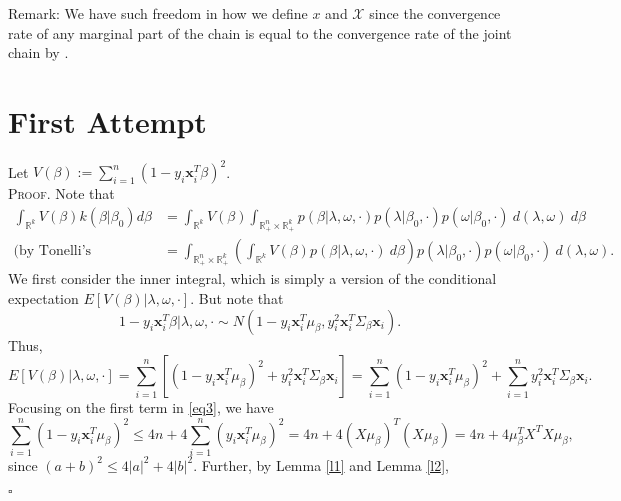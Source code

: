 \documentclass[12pt]{article}
\newcounter{ProofCounter}
\newenvironment{Proof}{\stepcounter{ProofCounter}\textsc{Proof.}}{\hfill$\square$}
\begin{document}
Remark: We have such freedom in how we define $x$ and $\mathcal{X}$ since the convergence rate of any marginal part of the chain is equal to the convergence rate
of the joint chain by \cite{jointvmarg}.

\section{First Attempt}

Let $V(\beta) := \sum_{i=1}^{n}(1 - y_i\bm{x}_i^T\beta)^2$. \\


\begin{Proof}
  Note that 
  \begin{align}
    \int_{\mathbb{R}^{k}} V(\beta) k(\beta|\beta_0)d\beta & = \int_{\mathbb{R}^{k}}V(\beta) \int_{\mathbb{R}^{n}_+\times \mathbb{R}^{k}_+}
    p(\beta|\lambda,\omega, \cdot)p(\lambda|\beta_0, \cdot)p(\omega|\beta_0, \cdot)\ d(\lambda, \omega)\ d\beta \nonumber \\
    \text{(by Tonelli's Theorem)} \ & = \int_{\mathbb{R}^{n}_+\times\mathbb{R}^{k}_+} \left( \int_{\mathbb{R}^{k}} V(\beta)p(\beta|\lambda, \omega,
    \cdot)\ d\beta \right) p(\lambda|\beta_0,\cdot)p(\omega|\beta_0, \cdot)\ d(\lambda, \omega).
    \label{eq0}
  \end{align}
  We first consider the inner integral, which is simply a version of the conditional expectation $E[V(\beta)|\lambda,\omega,\cdot]$.
  But note that 
  \begin{equation*}
    1 - y_i\bm{x}_i^T\beta | \lambda, \omega, \cdot \sim N\left( 1 - y_i\bm{x}_i^T\mu_{\beta}, y_i^2 \bm{x}_i^T \Sigma_{\beta}\bm{x}_i\right).
    \label{eq2}
  \end{equation*}
  Thus,
  \begin{equation}
    E[V(\beta)|\lambda,\omega,\cdot] = \sum_{i=1}^{n}\left[(1 - y_i\bm{x}_i^T\mu_{\beta})^2 + y_i^2 \bm{x}_i^T \Sigma_{\beta} \bm{x}_i\right] = \sum_{i=1}^{n}
    (1 - y_i\bm{x}_i^T\mu_{\beta})^2 + \sum_{i=1}^{n}y_i^2\bm{x}_i^T\Sigma_{\beta}\bm{x}_i.
    \label{eq3}
  \end{equation}
  Focusing on the first term in \eqref{eq3}, we have 
  \begin{equation}
    \sum_{i=1}^{n}(1 - y_i \bm{x}_i^T \mu_{\beta})^2 \leq 4n + 4\sum_{i=1}^{n}(y_i\bm{x}_i^T \mu_{\beta})^2 = 4n + 4(X\mu_{\beta})^T (X\mu_{\beta}) 
    = 4n + 4\mu_{\beta}^T X^T X \mu_{\beta},
    \label{eq4}
  \end{equation}
  since $(a + b)^2 \leq 4|a|^2 + 4|b|^2$. Further, by Lemma \ref{l1} and Lemma \ref{l2},

\end{Proof}
\end{document}
